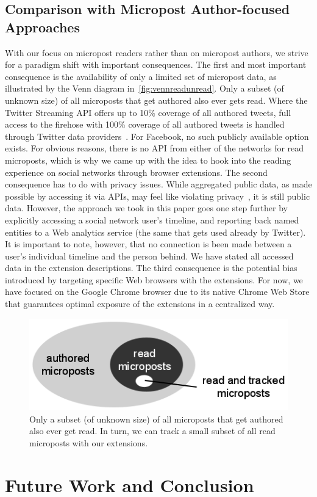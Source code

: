 \documentclass{iosart2c}
\begin{document}
\subsection{Comparison with Micropost Author-focused Approaches}
With our focus on micropost readers rather than on micropost authors, we strive for a paradigm shift with important consequences.
The first and most important consequence is the availability of only a limited set of micropost data, as illustrated by the Venn diagram in~\autoref{fig:vennreadunread}.
Only a subset (of unknown size) of all microposts that get authored also ever gets read.
Where the Twitter Streaming API offers up to 10\% coverage of all authored tweets, full access to the firehose with 100\% coverage of all authored tweets is handled through Twitter data providers~\cite{dataproviders}.
For Facebook, no such publicly available option exists.
For obvious reasons, there is no API from either of the networks for read microposts, which is why we came up with the idea to hook into the reading experience on social networks through browser extensions.
The second consequence has to do with privacy issues.
While aggregated public data, as made possible by accessing it via APIs, may feel like violating privacy~\cite{nyt}, it is still public data.
However, the approach we took in this paper goes one step further by explicitly accessing a social network user's timeline, and reporting back named entities to a Web analytics service (the same that gets used already by Twitter). 
It is important to note, however, that no connection is been made between a user's individual timeline and the person behind.
We have stated all accessed data in the extension descriptions.
The third consequence is the potential bias introduced by targeting specific Web browsers with the extensions. 
For now, we have focused on the Google Chrome browser due to its native Chrome Web Store that guarantees optimal exposure of the extensions in a centralized way.

\begin{figure}
\centering
\includegraphics[width=0.6\linewidth]{./resources/vennreadunread.png}
\caption{Only a subset (of unknown size) of all microposts that get authored also ever get read. In turn, we can track a small subset of all read microposts with our extensions.}
\label{fig:vennreadunread}
\end{figure}

\section{Future Work and Conclusion} \label{sec:futureworkandconclusion}



\end{document}
